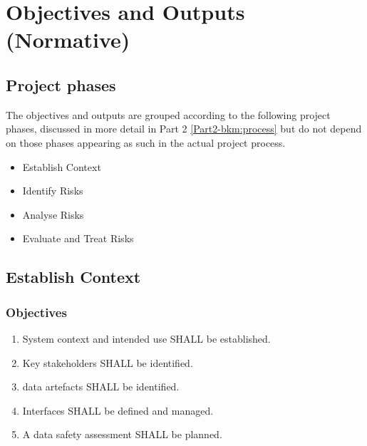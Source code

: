 %
%
\chapter{Objectives and Outputs (Normative)} \label{bkm:objectivesoutputs}

\section{Project phases}
The objectives and outputs are grouped according to the following project phases, discussed in more detail in Part 2 \ref{Part2-bkm:process} but do not depend on those phases appearing as such in the actual project process.
\begin{itemize}
	\item Establish Context
	\item Identify Risks
	\item Analyse Risks
	\item Evaluate and Treat Risks
\end{itemize}
\section{Establish Context}
\subsection{Objectives}
\begin{enumerate}[label=\color{dsiwgAccentColour}{1-\arabic*}]
	\item System context and intended use SHALL be established.
	\item Key \glspl{stakeholder} SHALL be identified.
	\item {}\Glspl{data artefact} SHALL be identified.
	\item Interfaces SHALL be defined and managed.
	\item A \gls{data safety assessment} SHALL be planned.
\end{enumerate}

